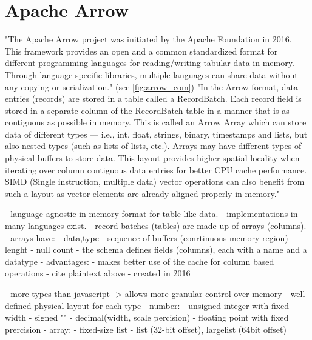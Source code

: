 \section{Apache Arrow}
\label{section:arrow}
"The Apache Arrow project was initiated by the Apache Foundation in 2016.
This framework provides an open and a common standardized format for different programming languages for reading/writing tabular data in-memory.
Through language-specific libraries, multiple languages can share data without any copying or serialization." \autocite{Ahmad2020} (see \ref{fig:arrow_com})
"In the Arrow format, data entries (records) are stored in a table called a RecordBatch.
Each record field is stored in a separate column of the RecordBatch table in a manner that is as contiguous as possible in memory.
This is called an Arrow Array which can store data of different types — i.e., int, float, strings, binary, timestamps and lists, but also nested types (such as lists of lists, etc.).
Arrays may have different types of physical buffers to store data.
This layout provides higher spatial locality when iterating over column contiguous data entries for better CPU cache performance.
SIMD (Single instruction, multiple data) vector operations can also benefit from such a layout as vector elements are already aligned properly in memory." \autocite{Ahmad2020}

- language agnostic in memory format for table like data.
- implementations in many languages exist. %
- record batches (tables) are made up of arrays (columns).
- arrays have:
- data,type
- sequence of buffers (conrtinuous memory region)
- lenght
- null count
- the schema defines fields (columns), each with a name and a datatype
- advantages:
- makes better use of the cache for column based operations
- cite plaintext above
- created in 2016

- more types than javascript -> allows more granular control over memory
- well defined physical layout for each type
- number:
- unsigned integer with fixed width
- signed ""
- decimal(width, scale percision)
- floating point with fixed prercision
- array:
- fixed-size list
- list (32-bit offset), largelist (64bit offset)

